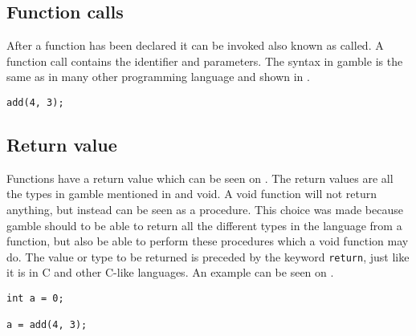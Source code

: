 \subsection*{Function calls}
After a function has been declared it can be invoked also known as called. 
A function call contains the identifier and parameters. 
The syntax in \gls{gamble} is the same as in many other programming language and shown in . 

\begin{lstlisting}[caption={A function call in \gls{gamble}},label={lst:functionCall},numbers=none]
add(4, 3);
\end{lstlisting}


\subsection*{Return value}
Functions have a return value which can be seen on .
The return values are all the types in \gls{gamble} mentioned in  and void. 
A void function will not return anything, but instead can be seen as a procedure.
This choice was made because \gls{gamble} should to be able to return all the different types in the language from a function, but also be able to perform these procedures which a void function may do.
The value or type to be returned is preceded by the keyword \texttt{return}, just like it is in C and other C-like languages.
An example can be seen on .

\begin{lstlisting}[caption={Return Function},label={lst:returnFunction}]
int a = 0;

a = add(4, 3);
\end{lstlisting}


%


